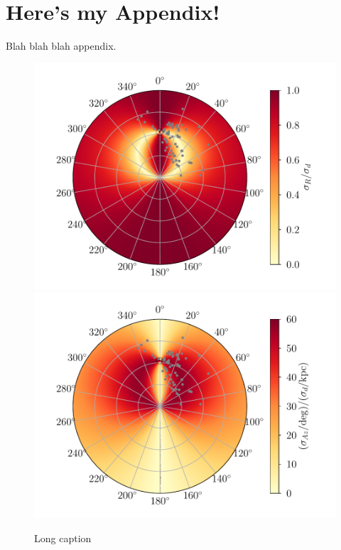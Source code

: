 \chapter{Here's my Appendix! \label{sec:appendixA}}

Blah blah blah appendix.

\begin{figure}[p]
  \centering
  \includegraphics[width=0.75\linewidth]{appendix_A/figures/faceon_rgal.pdf}
  \includegraphics[width=0.75\linewidth]{appendix_A/figures/faceon_az.pdf}
  \caption[Short Caption]{Long caption}
  \label{fig:appA_faceon_unc}
\end{figure}
\afterpage{\clearpage}
